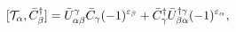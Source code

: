 \begin{equation}\label{5.18}
[{\cal T}_\alpha,\bar{C}^\dagger_\beta]=
\bar{U}^\gamma_{\alpha\beta}\bar{C}_\gamma(-1)^{\varepsilon_\beta}+
\bar{C}^\dagger_\gamma\bar{U}^{\dagger\gamma}_{\beta\alpha}
(-1)^{\varepsilon_\alpha},
\end{equation}

